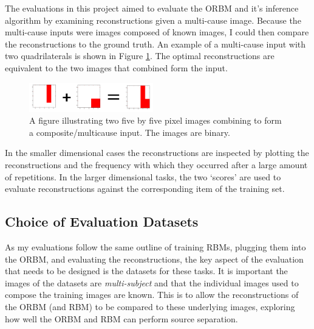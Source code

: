 The evaluations in this project aimed to evaluate the ORBM and it's inference algorithm by examining reconstructions given a multi-cause image. Because the multi-cause inputs were images composed of known images, I could then compare the reconstructions to the ground truth. An example of a multi-cause input with two quadrilaterals is shown in Figure \ref{F:Composite-Example}. The optimal reconstructions are equivalent to the two images that combined form the input.

\begin{figure}
  \begin{center}
    \includegraphics[width=0.48\textwidth]{Assets/Composite-Example.png}
  \end{center}
  \caption{A figure illustrating two five by five pixel images combining to form a composite/multicause input. The images are binary.}
  \label{F:Composite-Example}
\end{figure}

In the smaller dimensional cases the reconstructions are inspected by plotting the reconstructions and the frequency with which they occurred after a large amount of repetitions. In the larger dimensional tasks, the two `scores' are used to evaluate reconstructions against the corresponding item of the training set.


\subsection{Choice of Evaluation Datasets}

As my evaluations follow the same outline of training RBMs, plugging them into the ORBM, and evaluating the reconstructions, the key aspect of the evaluation that needs to be designed is the datasets for these tasks. It is important the images of the datasets are \emph{multi-subject} and that the individual images used to compose the training images are known. This is to allow the reconstructions of the ORBM (and RBM) to be compared to these underlying images, exploring how well the ORBM and RBM can perform source separation.

